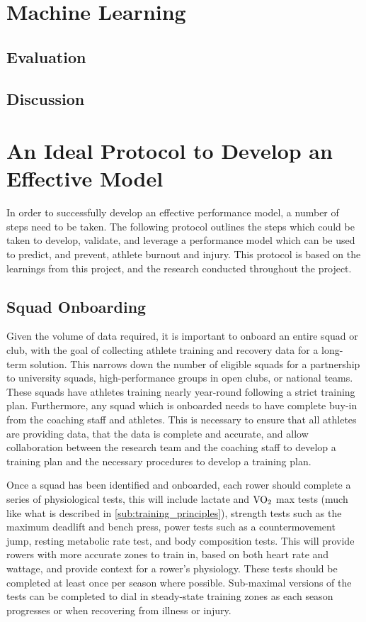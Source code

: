 \section{Machine Learning}
\subsection{Evaluation}
\subsection{Discussion}

\section{\label{sec:model-devel-prot}An Ideal Protocol to Develop an Effective Model}
In order to successfully develop an effective performance model, a number of steps need to be taken. The following protocol outlines the steps which could be taken to develop, validate, and leverage a performance model which can be used to predict, and prevent, athlete burnout and injury. This protocol is based on the learnings from this project, and the research conducted throughout the project.

\subsection{\label{sub:ideal-onboard}Squad Onboarding}
Given the volume of data required, it is important to onboard an entire squad or club, with the goal of collecting athlete training and recovery data for a long-term solution. This narrows down the number of eligible squads for a partnership to university squads, high-performance groups in open clubs, or national teams. These squads have athletes training nearly year-round following a strict training plan. Furthermore, any squad which is onboarded needs to have complete buy-in from the coaching staff and athletes. This is necessary to ensure that all athletes are providing data, that the data is complete and accurate, and allow collaboration between the research team and the coaching staff to develop a training plan and the necessary procedures to develop a training plan.

Once a squad has been identified and onboarded, each rower should complete a series of physiological tests, this will include lactate and $\textnormal{VO}_2$ max tests (much like what is described in \autoref{sub:training_principles}), strength tests such as the maximum deadlift and bench press, power tests such as a countermovement jump, resting metabolic rate test, and body composition tests. This will provide rowers with more accurate zones to train in, based on both heart rate and wattage, and provide context for a rower's physiology. These tests should be completed at least once per season where possible. Sub-maximal versions of the tests can be completed to dial in steady-state training zones as each season progresses or when recovering from illness or injury.

